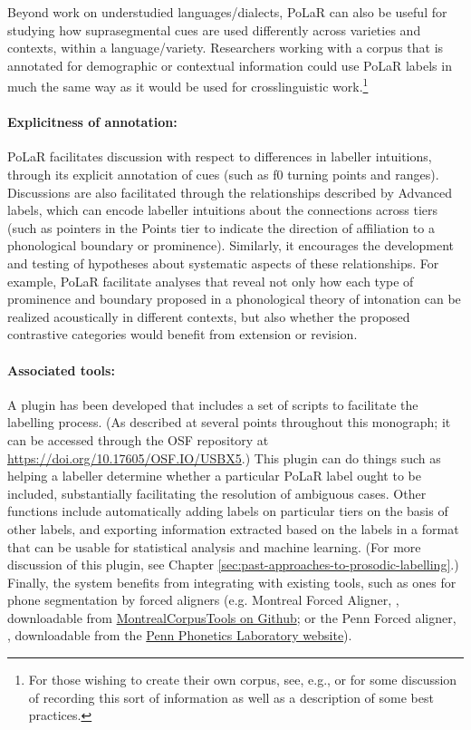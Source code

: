 Beyond work on understudied languages\slash dialects, PoLaR can also be useful for studying how suprasegmental cues are used differently across varieties and contexts, within a language\slash variety. Researchers working with a corpus that is annotated for demographic or contextual information could use PoLaR labels in much the same way as it would be used for crosslinguistic work.\footnote{For those wishing to create their own corpus, see, e.g., \citealt{meyerhoff-11} or \citealt{podesvasharma13} for some discussion of recording this sort of information as well as a description of some best practices.}

\paragraph{Explicitness of annotation:}
PoLaR facilitates discussion with respect to differences in labeller intuitions, through its explicit annotation of cues (such as f0 turning points and ranges). Discussions are also facilitated through the relationships described by Advanced labels, which can encode labeller intuitions about the connections across tiers (such as pointers in the Points tier to indicate the direction of affiliation to a phonological boundary or prominence). Similarly, it encourages the development and testing of hypotheses about systematic aspects of these relationships. For example, PoLaR facilitate analyses that reveal not only how each type of prominence and boundary proposed in a phonological theory of intonation can be realized acoustically in different contexts, but also whether the proposed contrastive categories would benefit from extension or revision.

\paragraph{Associated tools:}
A plugin has been developed that includes a set of scripts to facilitate the labelling process. (As described at several points throughout this monograph; it can be accessed through the OSF repository at \url{https://doi.org/10.17605/OSF.IO/USBX5}.) This plugin can do things such as helping a labeller determine whether a particular PoLaR label ought to be included, substantially facilitating the resolution of ambiguous cases. Other functions include automatically adding labels on particular tiers on the basis of other labels, and exporting information extracted based on the labels in a format that can be usable for statistical analysis and machine learning.  (For more discussion of this plugin, see Chapter \ref{sec:past-approaches-to-prosodic-labelling}.) Finally, the system benefits from integrating with existing tools, such as ones for phone segmentation by forced aligners (e.g. Montreal Forced Aligner, \citealt{mcauliffe-19}, downloadable from \href{https://github.com/MontrealCorpusTools/Montreal-Forced-Aligner}{MontrealCorpusTools on Github}; or the Penn Forced aligner, \citealt{yuanliberman08}, downloadable from the \href{https://web.sas.upenn.edu/phonetics-lab/facilities/}{Penn Phonetics Laboratory website}).

